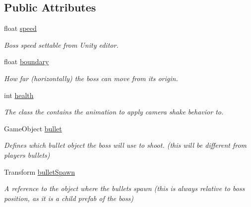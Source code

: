 \subsection*{Public Attributes}
\begin{DoxyCompactItemize}
\item 
\mbox{\label{class_queen_bauss_a11c5f07cee01d4587cad453edbb32fa3}} 
float \mbox{\hyperlink{class_queen_bauss_a11c5f07cee01d4587cad453edbb32fa3}{speed}}
\begin{DoxyCompactList}\small\item\em Boss speed settable from Unity editor. \end{DoxyCompactList}\item 
\mbox{\label{class_queen_bauss_a738d137bcf9a273c67a1b122c6f28822}} 
float \mbox{\hyperlink{class_queen_bauss_a738d137bcf9a273c67a1b122c6f28822}{boundary}}
\begin{DoxyCompactList}\small\item\em How far (horizontally) the boss can move from its origin. \end{DoxyCompactList}\item 
int \mbox{\hyperlink{class_queen_bauss_a4b5e0b4ec9040a158c5fafca921593e2}{health}}
\begin{DoxyCompactList}\small\item\em The class the contains the animation to apply camera shake behavior to. \end{DoxyCompactList}\item 
\mbox{\label{class_queen_bauss_a3b035e20519b15a46b1cfa28a3300d1a}} 
Game\+Object \mbox{\hyperlink{class_queen_bauss_a3b035e20519b15a46b1cfa28a3300d1a}{bullet}}
\begin{DoxyCompactList}\small\item\em Defines which bullet object the boss will use to shoot. (this will be different from player\textquotesingle{}s bullets) \end{DoxyCompactList}\item 
\mbox{\label{class_queen_bauss_a5c17fa20ec6761760b7651176a1c1e7e}} 
Transform \mbox{\hyperlink{class_queen_bauss_a5c17fa20ec6761760b7651176a1c1e7e}{bullet\+Spawn}}
\begin{DoxyCompactList}\small\item\em A reference to the object where the bullets spawn (this is always relative to boss position, as it is a child prefab of the boss) \end{DoxyCompactList}\item 

\end{DoxyCompactItemize}
